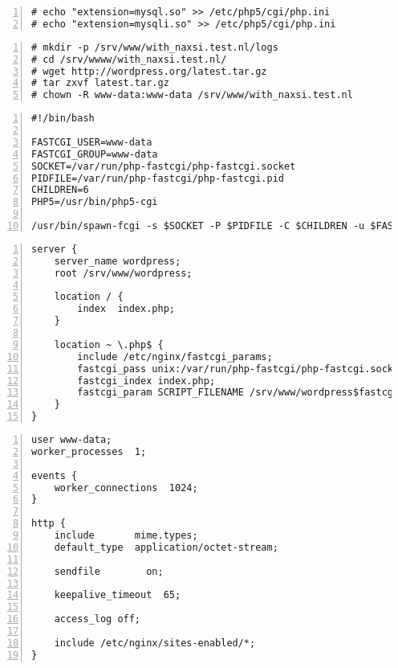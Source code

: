\documentclass[Configuration]{subfiles}
\begin{document}
\begin{lstlisting}[frame=single,caption=/etc/php5/cgi/php.ini,backgroundcolor=\color{gray},breaklines=true,numbers=left,]
# echo "extension=mysql.so" >> /etc/php5/cgi/php.ini
# echo "extension=mysqli.so" >> /etc/php5/cgi/php.ini
\end{lstlisting}

\begin{lstlisting}[frame=single,caption=Wordpress 3.5.1 installation,backgroundcolor=\color{gray},breaklines=true,numbers=left,]
# mkdir -p /srv/www/with_naxsi.test.nl/logs
# cd /srv/wwww/with_naxsi.test.nl/
# wget http://wordpress.org/latest.tar.gz
# tar zxvf latest.tar.gz 
# chown -R www-data:www-data /srv/www/with_naxsi.test.nl
\end{lstlisting}

\begin{lstlisting}[frame=single,caption=/usr/bin/php-fastcgi (needs chmod +x /usr/bin/php-fastcgi),backgroundcolor=\color{gray},breaklines=true,numbers=left,]
#!/bin/bash

FASTCGI_USER=www-data
FASTCGI_GROUP=www-data
SOCKET=/var/run/php-fastcgi/php-fastcgi.socket
PIDFILE=/var/run/php-fastcgi/php-fastcgi.pid
CHILDREN=6
PHP5=/usr/bin/php5-cgi

/usr/bin/spawn-fcgi -s $SOCKET -P $PIDFILE -C $CHILDREN -u $FASTCGI_USER -g $FASTCGI_GROUP -f $PHP5
\end{lstlisting}

\begin{lstlisting}[frame=single,caption=/etc/nginx/sites-enabled/wordpress,backgroundcolor=\color{gray},breaklines=true,numbers=left,]
server {
    server_name wordpress;
    root /srv/www/wordpress;

    location / {
        index  index.php;
    }

    location ~ \.php$ {
        include /etc/nginx/fastcgi_params;
        fastcgi_pass unix:/var/run/php-fastcgi/php-fastcgi.socket;
        fastcgi_index index.php;
        fastcgi_param SCRIPT_FILENAME /srv/www/wordpress$fastcgi_script_name;
    }
}
\end{lstlisting}

\begin{lstlisting}[frame=single,caption=/etc/nginx/nginx.conf,backgroundcolor=\color{gray},breaklines=true,numbers=left,]
user www-data;
worker_processes  1;

events {
    worker_connections  1024;
}

http {
    include       mime.types;
    default_type  application/octet-stream;

    sendfile        on;

    keepalive_timeout  65;

    access_log off;

    include /etc/nginx/sites-enabled/*;
}
\end{lstlisting}
\end{document}

